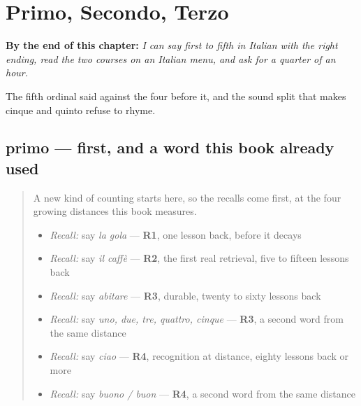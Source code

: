 
\chapter{Primo, Secondo, Terzo}
\label{ch:it-ordinali}

\begin{chapteropening}
\textbf{By the end of this chapter:} \emph{I can say first to fifth in Italian with the right ending, read the two courses on an Italian menu, and ask for a quarter of an hour.}

The fifth ordinal said against the four before it, and the sound split that makes cinque and quinto refuse to rhyme.
\end{chapteropening}

\section[primo / prima]{primo — first, and a word this book already used}

\label{lesson:IT-C26-primo}



\begin{quote}
A new kind of counting starts here, so the recalls come first, at the four growing distances this book measures.

\begin{itemize}
\raggedright
  \item \emph{Recall:} say \emph{la gola} — \textbf{R1}, one lesson back, before it decays
  \item \emph{Recall:} say \emph{il caffè} — \textbf{R2}, the first real retrieval, five to fifteen lessons back
  \item \emph{Recall:} say \emph{abitare} — \textbf{R3}, durable, twenty to sixty lessons back
  \item \emph{Recall:} say \emph{uno, due, tre, quattro, cinque} — \textbf{R3}, a second word from the same distance
  \item \emph{Recall:} say \emph{ciao} — \textbf{R4}, recognition at distance, eighty lessons back or more
  \item \emph{Recall:} say \emph{buono / buon} — \textbf{R4}, a second word from the same distance
\end{itemize}
\end{quote}

